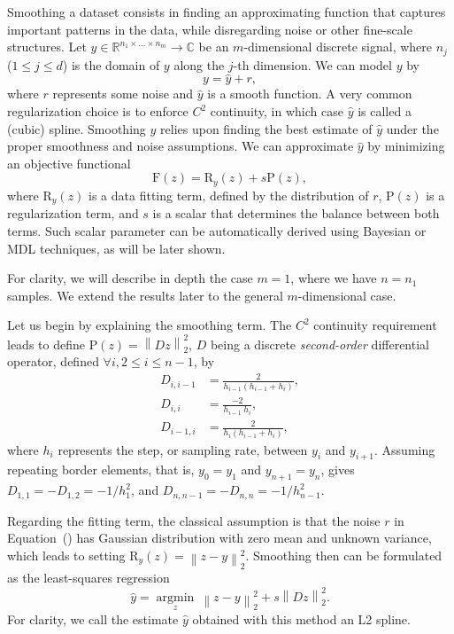 \documentclass[preprint]{imsart}
\newcommand{\argmin}[1]{\underset{#1}{\operatorname{argmin}}\ }
\newcommand{\funct}[1]{\mathrm{#1}}
\newcommand{\norm}[2]{\left\| #1 \right\|_{#2}}
\newcommand{\Real}{{\mathbb R}}
\newcommand{\Complex}{{\mathbb C}}
\begin{document}
Smoothing a dataset consists in finding an approximating function that captures important patterns in the data, while disregarding noise or other fine-scale structures. Let $y \in \Real^{n_1 \times \dots \times n_m} \rightarrow \Complex$ be an $m$-dimensional discrete signal, where $n_j$ ($1 \leq j \leq d$) is the domain of $y$ along the $j$-th dimension. We can model $y$ by
\begin{equation}
    y = \hat{y} + r ,
    \label{eq:model}
\end{equation}
where $r$ represents some noise and $\hat{y}$ is a smooth function. A very common regularization choice is to enforce $C^2$ continuity, in which case $\hat{y}$ is called a (cubic) spline. Smoothing $y$ relies upon finding the best estimate of $\hat{y}$ under the proper smoothness and noise assumptions.
We can approximate $\hat{y}$ by minimizing an objective functional
\begin{equation}
    \funct{F}(z) = \funct{R}_y (z) + s \funct{P}(z) ,
\end{equation}
where $\funct{R}_y (z)$ is a data fitting term, defined by the distribution of $r$, $\funct{P}(z)$ is a regularization term, and $s$ is a scalar that determines the balance between both terms. Such scalar parameter can be automatically derived using Bayesian or MDL techniques, as will be later shown.

For clarity, we will describe in depth the case $m=1$, where we have $n=n_1$ samples. We extend the results later to the general $m$-dimensional case.

Let us begin by explaining the smoothing term.
The $C^2$ continuity requirement leads to define $\funct{P}(z) = \norm{Dz}{2}^ 2$, $D$ being a discrete \emph{second-order} differential operator, defined $\forall i, 2 \leq i \leq n-1$, by
\begin{align}
    D_{i, i-1} &= \tfrac{2}{h_{i-1} (h_{i-1} + h_{i})} ,\\
    D_{i, i} &= \tfrac{-2}{h_{i-1} \ h_{i}} ,\\
    D_{i-1, i} &= \tfrac{2}{h_{i} (h_{i-1} + h_{i})} ,
\end{align}
where $h_i$ represents the step, or sampling rate, between $y_i$ and $y_{i+1}$.
Assuming repeating border elements, that is, $y_0 = y_1$ and $y_{n+1}  =y_n$, gives $D_{1, 1} = -D_{1, 2} = -1/h_1^2$, and $D_{n, n-1} = -D_{n, n} = -1/h_{n-1}^2$.

Regarding the fitting term, the classical assumption is that the noise $r$ in Equation~() has Gaussian distribution with zero mean and unknown variance, which leads to setting $\funct{R}_y (z) = \norm{z - y}{2}^2$. 
Smoothing then can be formulated as the least-squares regression
\begin{equation*}
    \hat{y} = \argmin{z} \norm{z - y}{2}^2 + s \norm{Dz}{2}^ 2 .
\end{equation*}
For clarity, we call the estimate $\hat{y}$ obtained with this method an L2 spline.
\end{document}

